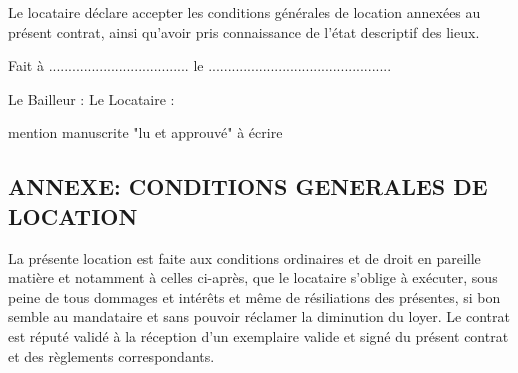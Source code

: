 \documentclass[a4paper,11pt]{article}
\begin{document}
\vspace{0.5cm}

Le locataire déclare accepter les conditions générales de location annexées au présent contrat, ainsi qu'avoir pris connaissance de l'état descriptif des lieux.

\vspace{0.5cm}

Fait à .................................... le ...............................................

\vspace{0.5cm}

Le Bailleur : \hspace{3cm}Le Locataire : 

\hspace{5.2cm}mention manuscrite "lu et approuvé" à écrire


\newpage{}




\begin{center}
\section*  { ANNEXE: CONDITIONS GENERALES  DE LOCATION}
\end{center}


\tiny



La présente location est faite aux conditions ordinaires et de droit en pareille matière et notamment à celles ci-après, que le locataire s’oblige à exécuter, sous peine de tous dommages et intérêts et même de résiliations des présentes, si bon semble au mandataire et sans pouvoir réclamer la diminution du loyer.
Le contrat est réputé validé à la réception d’un exemplaire valide et signé du présent contrat et des règlements correspondants.
\end{document}
